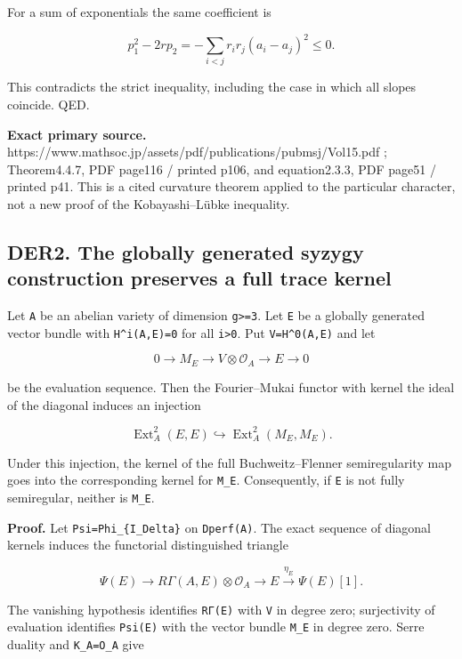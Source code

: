 \documentclass[11pt,a4paper]{article}
\theoremstyle{definition}
\begin{document}
For a sum of exponentials the same coefficient is

\[
 p_1^2-2rp_2
 =-\sum_{i<j}r_i r_j(a_i-a_j)^2\le0.
\]

This contradicts the strict inequality, including the case in which all
slopes coincide. QED.

\textbf{Exact primary source.}
https://www.mathsoc.jp/assets/pdf/publications/pubmsj/Vol15.pdf ;
Theorem4.4.7, PDF page116 / printed p106, and equation2.3.3, PDF page51
/ printed p41. This is a cited curvature theorem applied to the
particular character, not a new proof of the Kobayashi--Lübke
inequality.

\subsection{DER2. The globally generated syzygy construction preserves a
full trace
kernel}\label{der2.-the-globally-generated-syzygy-construction-preserves-a-full-trace-kernel}

Let \texttt{A} be an abelian variety of dimension
\texttt{g\textgreater{}=3}. Let \texttt{E} be a globally generated
vector bundle with \texttt{H\^{}i(A,E)=0} for all
\texttt{i\textgreater{}0}. Put \texttt{V=H\^{}0(A,E)} and let

\[
 0\longrightarrow M_E\longrightarrow V\otimes\mathcal O_A
 \longrightarrow E\longrightarrow0
\tag{DER2a}
\]

be the evaluation sequence. Then the Fourier--Mukai functor with kernel
the ideal of the diagonal induces an injection

\[
 \operatorname{Ext}^2_A(E,E)
 \hookrightarrow \operatorname{Ext}^2_A(M_E,M_E).
\tag{DER2b}
\]

Under this injection, the kernel of the full Buchweitz--Flenner
semiregularity map goes into the corresponding kernel for \texttt{M\_E}.
Consequently, if \texttt{E} is not fully semiregular, neither is
\texttt{M\_E}.

\textbf{Proof.} Let \texttt{Psi=Phi\_\{I\_Delta\}} on \texttt{Dperf(A)}.
The exact sequence of diagonal kernels induces the functorial
distinguished triangle

\[
 \Psi(E)\longrightarrow R\Gamma(A,E)\otimes\mathcal O_A
 \longrightarrow E\xrightarrow{\eta_E}\Psi(E)[1].
\]

The vanishing hypothesis identifies \texttt{RΓ(E)} with \texttt{V} in
degree zero; surjectivity of evaluation identifies \texttt{Psi(E)} with
the vector bundle \texttt{M\_E} in degree zero. Serre duality and
\texttt{K\_A=O\_A} give
\end{document}
